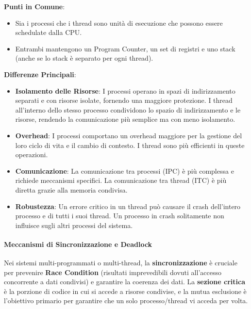\textbf{Punti in Comune}:
\begin{itemize}
    \item Sia i processi che i thread sono unità di esecuzione che possono essere schedulate dalla CPU.
    \item Entrambi mantengono un Program Counter, un set di registri e uno stack (anche se lo stack è separato per ogni thread).
\end{itemize}
\textbf{Differenze Principali}:
\begin{itemize}
    \item \textbf{Isolamento delle Risorse}: I processi operano in spazi di indirizzamento separati e con risorse isolate, fornendo una maggiore protezione. I thread all'interno dello stesso processo condividono lo spazio di indirizzamento e le risorse, rendendo la comunicazione più semplice ma con meno isolamento.
    \item \textbf{Overhead}: I processi comportano un overhead maggiore per la gestione del loro ciclo di vita e il cambio di contesto. I thread sono più efficienti in queste operazioni.
    \item \textbf{Comunicazione}: La comunicazione tra processi (IPC) è più complessa e richiede meccanismi specifici. La comunicazione tra thread (ITC) è più diretta grazie alla memoria condivisa.
    \item \textbf{Robustezza}: Un errore critico in un thread può causare il crash dell'intero processo e di tutti i suoi thread. Un processo in crash solitamente non influisce sugli altri processi del sistema.
\end{itemize}

\paragraph{Meccanismi di Sincronizzazione e Deadlock}
Nei sistemi multi-programmati o multi-thread, la \textbf{sincronizzazione} è cruciale per prevenire \textbf{Race Condition} (risultati imprevedibili dovuti all'accesso concorrente a dati condivisi) e garantire la coerenza dei dati. La \textbf{sezione critica} è la porzione di codice in cui si accede a risorse condivise, e la mutua esclusione è l'obiettivo primario per garantire che un solo processo/thread vi acceda per volta.

